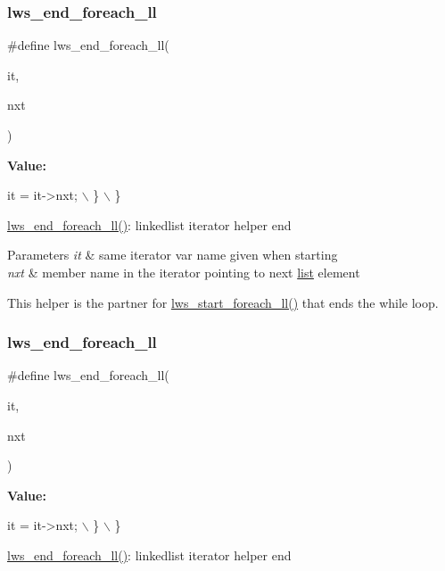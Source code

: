 \subsubsection{\texorpdfstring{lws\+\_\+end\+\_\+foreach\+\_\+ll}{lws\_end\_foreach\_ll}\hspace{0.1cm}{\footnotesize\ttfamily [3/6]}}
{\footnotesize\ttfamily \#define lws\+\_\+end\+\_\+foreach\+\_\+ll(\begin{DoxyParamCaption}\item[{}]{it,  }\item[{}]{nxt }\end{DoxyParamCaption})}

{\bfseries Value\+:}
\begin{DoxyCode}
it = it->nxt; \(\backslash\)
    \} \(\backslash\)
\}
\end{DoxyCode}
\hyperlink{group__misc_ga9d94995ca7a1be16bf3d7bd2e449c812}{lws\+\_\+end\+\_\+foreach\+\_\+ll()}\+: linkedlist iterator helper end


\begin{DoxyParams}{Parameters}
{\em it} & same iterator var name given when starting \\
\hline
{\em nxt} & member name in the iterator pointing to next \hyperlink{protocollist-p}{list} element\\
\hline
\end{DoxyParams}
This helper is the partner for \hyperlink{group__misc_ga9f138b98c73782807d88e76c1c532dc2}{lws\+\_\+start\+\_\+foreach\+\_\+ll()} that ends the while loop. \mbox{\label{group__misc_ga9d94995ca7a1be16bf3d7bd2e449c812}} 
\subsubsection{\texorpdfstring{lws\+\_\+end\+\_\+foreach\+\_\+ll}{lws\_end\_foreach\_ll}\hspace{0.1cm}{\footnotesize\ttfamily [4/6]}}
{\footnotesize\ttfamily \#define lws\+\_\+end\+\_\+foreach\+\_\+ll(\begin{DoxyParamCaption}\item[{}]{it,  }\item[{}]{nxt }\end{DoxyParamCaption})}

{\bfseries Value\+:}
\begin{DoxyCode}
it = it->nxt; \(\backslash\)
    \} \(\backslash\)
\}
\end{DoxyCode}
\hyperlink{group__misc_ga9d94995ca7a1be16bf3d7bd2e449c812}{lws\+\_\+end\+\_\+foreach\+\_\+ll()}\+: linkedlist iterator helper end


